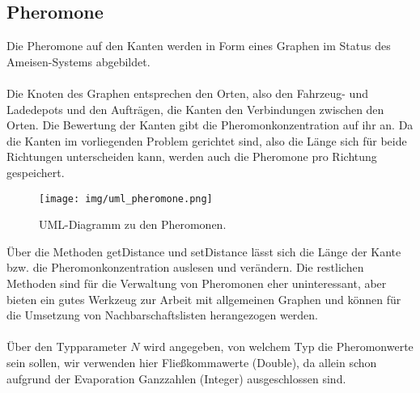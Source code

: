 \subsection{Pheromone}
Die Pheromone auf den Kanten werden in Form eines Graphen im Status des Ameisen-Systems abgebildet. \\
\\
Die Knoten des Graphen entsprechen den Orten, also den Fahrzeug- und Ladedepots und den Aufträgen, die Kanten den Verbindungen zwischen den Orten. Die Bewertung der Kanten gibt die Pheromonkonzentration auf ihr an. Da die Kanten im vorliegenden Problem gerichtet sind, also die Länge sich für beide Richtungen unterscheiden kann, werden auch die Pheromone pro Richtung gespeichert. \\

\begin{wrapfigure}{r}{0.55\textwidth}
  \vspace{-20pt}
  \begin{center}
    \texttt{[image: img/uml\_pheromone.png]}
  \end{center}
  \vspace{-20pt}
  \caption{UML-Diagramm zu den Pheromonen.}
  \label{fig:uml_pheromone}
 \vspace{-10pt}
\end{wrapfigure}

\noindent
Über die Methoden \textsf{getDistance} und \textsf{setDistance} lässt sich die Länge der Kante bzw. die Pheromonkonzentration auslesen und verändern. Die restlichen Methoden sind für die Verwaltung von Pheromonen eher uninteressant, aber bieten ein gutes Werkzeug zur Arbeit mit allgemeinen Graphen und können für die Umsetzung von Nachbarschaftslisten herangezogen werden. \\
\\
Über den Typparameter $N$ wird angegeben, von welchem Typ die Pheromonwerte sein sollen, wir verwenden hier Fließkommawerte (\textsf{Double}), da allein schon aufgrund der Evaporation Ganzzahlen (\textsf{Integer}) ausgeschlossen sind.


